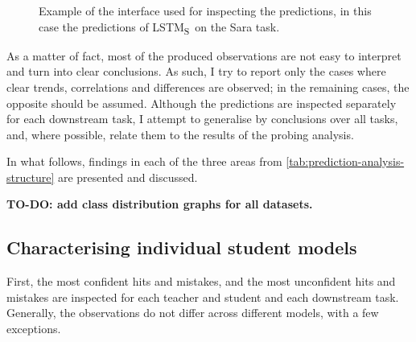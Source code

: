 \documentclass[bsc,frontabs,twoside,singlespacing,parskip,deptreport]{infthesis}
\def\LSTMS{LSTM\textsubscript{S}}
\begin{document}
{{    \begin{figure}[h!tb]
      \centering
      \caption{Example of the interface used for inspecting the predictions, in this case the predictions of \LSTMS~on the Sara task.}
      \label{fig:prediction-analysis-example}
    \end{figure}
    
    As a matter of fact, most of the produced observations are not easy to interpret and turn into clear conclusions.
    As such, I try to report only the cases where clear trends, correlations and differences are observed; in the remaining cases, the opposite should be assumed.
    Although the predictions are inspected separately for each downstream task, I attempt to generalise by conclusions over all tasks, and, where possible, relate them to the results of the probing analysis.

    In what follows, findings in each of the three areas from \autoref{tab:prediction-analysis-structure} are presented and discussed.
    
    \textbf{TO-DO: add class distribution graphs for all datasets.}
    \subsection{Characterising individual student models}{
      First, the most confident hits and mistakes, and the most unconfident hits and mistakes are inspected for each teacher and student and each downstream task. 
      Generally, the observations do not differ across different models, with a few exceptions.
      
}}}
\end{document}
